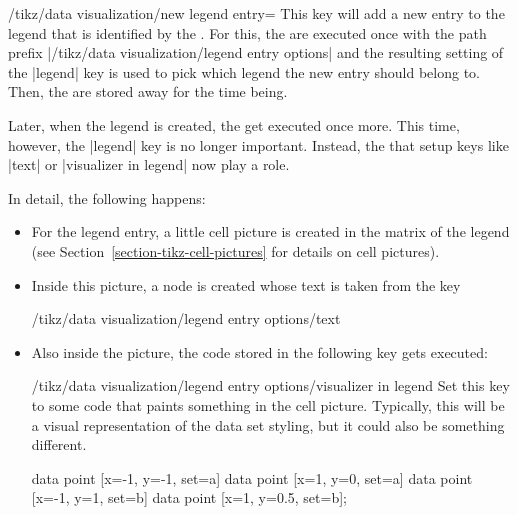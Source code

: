 \begin{key}{/tikz/data visualization/new legend entry=}
    This key will add a new entry to the legend that is identified by the
    . For this, the  are executed once with the
    path prefix |/tikz/data visualization/legend entry options| and the
    resulting setting of the |legend| key is used to pick which legend the new
    entry should belong to. Then, the  are stored away for the
    time being.

    Later, when the legend is created, the  get executed once
    more. This time, however, the |legend| key is no longer important. Instead,
    the  that setup keys like |text| or |visualizer in legend|
    now play a role.

    In detail, the following happens:
    \begin{itemize}
        \item For the legend entry, a little cell picture is created in the
            matrix of the legend (see Section~\ref{section-tikz-cell-pictures}
            for details on cell pictures).
        \item Inside this picture, a node is created whose text is taken from
            the key
\begin{codeexample}
/tikz/data visualization/legend entry options/text
\end{codeexample}
        \item Also inside the picture, the code stored in the following key
            gets executed:
            \begin{key}{/tikz/data visualization/legend entry options/visualizer in legend}
                Set this key to some code that paints something in the cell
                picture. Typically, this will be a visual representation of the
                data set styling, but it could also be something different.
\begin{codeexample}[width=6cm]
\tikz \datavisualization [
  school book axes, visualize as line/.list={a,b},
  style sheet=vary dashing,
  a={label in legend={text=a}},
  new legend entry={
    text=spacer,
    visualizer in legend={\draw[solid] (0,0) circle[radius=2pt];}
  },
  b={label in legend={text=b}}]
data point [x=-1, y=-1, set=a]   data point [x=1, y=0, set=a]
data point [x=-1, y=1,  set=b]   data point [x=1, y=0.5, set=b];
\end{codeexample}

\end{key}
\end{itemize}
\end{key}
